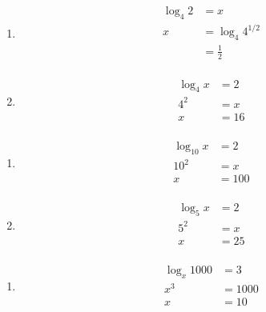 \documentclass{exam}
\begin{document}
\begin{description}
    \pagebreak

    \item[28]
      \begin{enumerate}[a]
        \item 
          \begin{align*}
            \log_4 2 &= x \\
            x        &= \log_4 4^{1/2} \\
                     &= \boxed{\frac{1}{2}} \\
          \end{align*}

        \item 
          \begin{align*}
            \log_4 x &= 2 \\
             4^2     &= x \\
            x        &= \boxed{16} \\
          \end{align*}
      \end{enumerate}

    \item[29]
      \begin{enumerate}[a]
        \item 
          \begin{align*}
            \log_{10} x &= 2 \\
             10^2       &= x \\
            x           &= \boxed{100} \\
          \end{align*}

        \item 
          \begin{align*}
            \log_{5} x &= 2 \\
            5^2        &= x \\
            x          &= \boxed{25} \\
          \end{align*}

      \end{enumerate}

  \pagebreak

    \item[30]
      \begin{enumerate}[a]
        \item 
          \begin{align*}
            \log_x 1000     &= 3 \\
            x^3             &= 1000 \\
            x               &= \boxed{10} \\
          \end{align*}


\end{enumerate}
\end{description}
\end{document}
